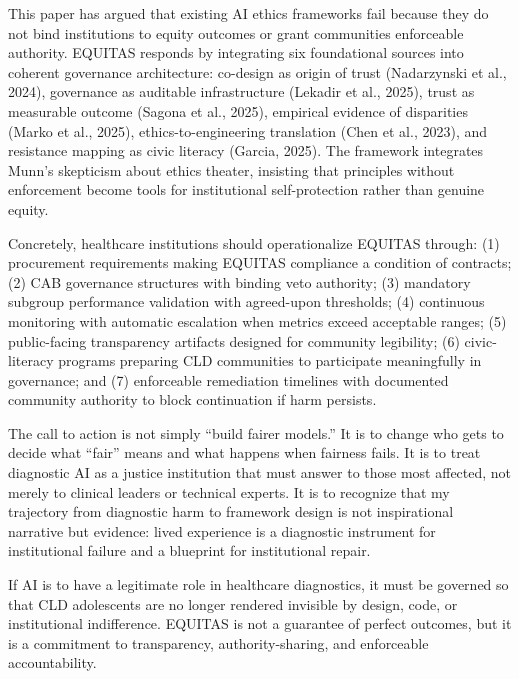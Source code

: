 \documentclass[12pt,a4paper]{article}
\begin{document}
This paper has argued that existing AI ethics frameworks fail because they do not bind institutions to equity outcomes or grant communities enforceable authority. EQUITAS responds by integrating six foundational sources into coherent governance architecture: co-design as origin of trust (Nadarzynski et al., 2024), governance as auditable infrastructure (Lekadir et al., 2025), trust as measurable outcome (Sagona et al., 2025), empirical evidence of disparities (Marko et al., 2025), ethics-to-engineering translation (Chen et al., 2023), and resistance mapping as civic literacy (Garcia, 2025).\cite{nadarzynski2024}\cite{lekadir2025}\cite{sagona2025}\cite{marko2025}\cite{chen2023}\cite{garcia_ed415} The framework integrates Munn's skepticism about ethics theater, insisting that principles without enforcement become tools for institutional self-protection rather than genuine equity.\cite{munn_idai700}

Concretely, healthcare institutions should operationalize EQUITAS through: (1) procurement requirements making EQUITAS compliance a condition of contracts; (2) CAB governance structures with binding veto authority; (3) mandatory subgroup performance validation with agreed-upon thresholds; (4) continuous monitoring with automatic escalation when metrics exceed acceptable ranges; (5) public-facing transparency artifacts designed for community legibility; (6) civic-literacy programs preparing CLD communities to participate meaningfully in governance; and (7) enforceable remediation timelines with documented community authority to block continuation if harm persists.\cite{garcia_ed415}

The call to action is not simply ``build fairer models.'' It is to change who gets to decide what ``fair'' means and what happens when fairness fails. It is to treat diagnostic AI as a justice institution that must answer to those most affected, not merely to clinical leaders or technical experts. It is to recognize that my trajectory from diagnostic harm to framework design is not inspirational narrative but evidence: lived experience is a diagnostic instrument for institutional failure and a blueprint for institutional repair.\cite{garcia_ed415}

If AI is to have a legitimate role in healthcare diagnostics, it must be governed so that CLD adolescents are no longer rendered invisible by design, code, or institutional indifference. EQUITAS is not a guarantee of perfect outcomes, but it is a commitment to transparency, authority-sharing, and enforceable accountability. 
\end{document}
